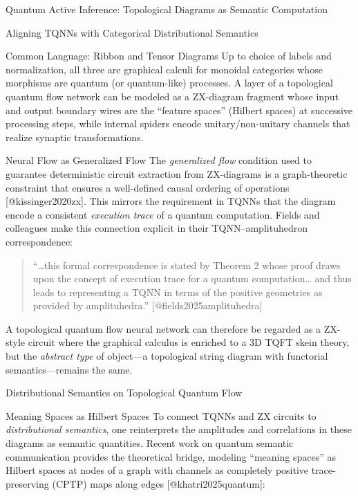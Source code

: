 \documentclass[
  ignorenonframetext,
]{beamer}
\begin{document}
\begin{frame}{Quantum Active Inference: Topological Diagrams as Semantic
Computation}
\begin{block}{Aligning TQNNs with Categorical Distributional Semantics}
\begin{block}{Common Language: Ribbon and Tensor Diagrams}
Up to choice of labels and normalization, all three are graphical
calculi for monoidal categories whose morphisms are quantum (or
quantum-like) processes. A layer of a topological quantum flow network
can be modeled as a ZX-diagram fragment whose input and output boundary
wires are the ``feature spaces'' (Hilbert spaces) at successive
processing steps, while internal spiders encode unitary/non-unitary
channels that realize synaptic transformations.
\end{block}

\begin{block}{Neural Flow as Generalized Flow}
\protect{}\label{neural-flow-as-generalized-flow}
The \emph{generalized flow} condition used to guarantee deterministic
circuit extraction from ZX-diagrams is a graph-theoretic constraint that
ensures a well-defined causal ordering of operations
{[}@kissinger2020zx{]}. This mirrors the requirement in TQNNs that the
diagram encode a consistent \emph{execution trace} of a quantum
computation. Fields and colleagues make this connection explicit in
their TQNN--amplituhedron correspondence:

\begin{quote}
``\ldots this formal correspondence is stated by Theorem 2 whose proof
draws upon the concept of execution trace for a quantum
computation\ldots{} and thus leads to representing a TQNN in terms of
the positive geometries as provided by amplituhedra.''
{[}@fields2025amplituhedra{]}
\end{quote}

A topological quantum flow neural network can therefore be regarded as a
ZX-style circuit where the graphical calculus is enriched to a 3D TQFT
skein theory, but the \emph{abstract type} of object---a topological
string diagram with functorial semantics---remains the same.
\end{block}
\end{block}

\begin{block}{Distributional Semantics on Topological Quantum Flow}
\protect{}\label{distributional-semantics-on-topological-quantum-flow}
\begin{block}{Meaning Spaces as Hilbert Spaces}
\protect{}\label{meaning-spaces-as-hilbert-spaces}
To connect TQNNs and ZX circuits to \emph{distributional semantics}, one
reinterprets the amplitudes and correlations in these diagrams as
semantic quantities. Recent work on quantum semantic communication
provides the theoretical bridge, modeling ``meaning spaces'' as Hilbert
spaces at nodes of a graph with channels as completely positive
trace-preserving (CPTP) maps along edges {[}@khatri2025quantum{]}:


\end{block}
\end{block}
\end{frame}
\end{document}
